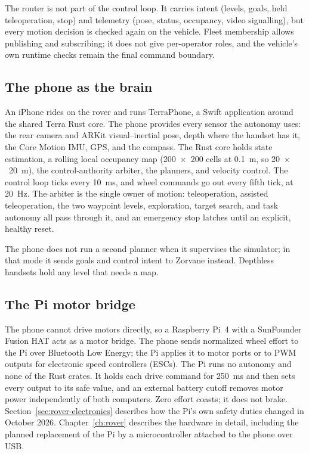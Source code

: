 The router is not part of the control loop.
It carries intent (levels, goals, held teleoperation, stop) and telemetry (pose, status, occupancy, video signalling), but every motion decision is checked again on the vehicle.
Fleet membership allows publishing and subscribing; it does not give per-operator roles, and the vehicle's own runtime checks remain the final command boundary.

\subsection{The phone as the brain}
\label{sec:env-phone}

An iPhone rides on the rover and runs TerraPhone, a Swift application around the shared Terra Rust core.
The phone provides every sensor the autonomy uses: the rear camera and ARKit visual--inertial pose, depth where the handset has it, the Core Motion IMU, GPS, and the compass.
The Rust core holds state estimation, a rolling local occupancy map (200~$\times$~200 cells at 0.1~m, so 20~$\times$~20~m), the control-authority arbiter, the planners, and velocity control.
The control loop ticks every 10~ms, and wheel commands go out every fifth tick, at 20~Hz.
The arbiter is the single owner of motion: teleoperation, assisted teleoperation, the two waypoint levels, exploration, target search, and task autonomy all pass through it, and an emergency stop latches until an explicit, healthy reset.

The phone does not run a second planner when it supervises the simulator; in that mode it sends goals and control intent to Zorvane instead.
Depthless handsets hold any level that needs a map.

\subsection{The Pi motor bridge}
\label{sec:env-pi}

The phone cannot drive motors directly, so a Raspberry Pi~4 with a SunFounder Fusion HAT acts as a motor bridge.
The phone sends normalized wheel effort to the Pi over Bluetooth Low Energy; the Pi applies it to motor ports or to PWM outputs for electronic speed controllers (ESCs).
The Pi runs no autonomy and none of the Rust crates.
It holds each drive command for 250~ms and then sets every output to its safe value, and an external battery cutoff removes motor power independently of both computers.
Zero effort coasts; it does not brake.
Section~\ref{sec:rover-electronics} describes how the Pi's own safety duties changed in October 2026.
Chapter~\ref{ch:rover} describes the hardware in detail, including the planned replacement of the Pi by a microcontroller attached to the phone over USB.

